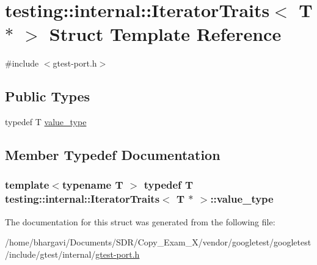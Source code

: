\hypertarget{structtesting_1_1internal_1_1_iterator_traits_3_01_t_01_5_01_4}{}\section{testing\+:\+:internal\+:\+:Iterator\+Traits$<$ T $\ast$ $>$ Struct Template Reference}
\label{structtesting_1_1internal_1_1_iterator_traits_3_01_t_01_5_01_4}


{\ttfamily \#include $<$gtest-\/port.\+h$>$}

\subsection*{Public Types}
\begin{DoxyCompactItemize}
\item 
typedef T \hyperlink{structtesting_1_1internal_1_1_iterator_traits_3_01_t_01_5_01_4_a7e46869ed36cc5aea898e243d270a8be}{value\+\_\+type}
\end{DoxyCompactItemize}


\subsection{Member Typedef Documentation}
\subsubsection[{\texorpdfstring{value\+\_\+type}{value_type}}]{\setlength{\rightskip}{0pt plus 5cm}template$<$typename T $>$ typedef T {\bf testing\+::internal\+::\+Iterator\+Traits}$<$ T $\ast$ $>$\+::{\bf value\+\_\+type}}\hypertarget{structtesting_1_1internal_1_1_iterator_traits_3_01_t_01_5_01_4_a7e46869ed36cc5aea898e243d270a8be}{}\label{structtesting_1_1internal_1_1_iterator_traits_3_01_t_01_5_01_4_a7e46869ed36cc5aea898e243d270a8be}


The documentation for this struct was generated from the following file\+:\begin{DoxyCompactItemize}
\item 
/home/bhargavi/\+Documents/\+S\+D\+R/\+Copy\+\_\+\+Exam\+\_\+X/vendor/googletest/googletest/include/gtest/internal/\hyperlink{gtest-port_8h}{gtest-\/port.\+h}\end{DoxyCompactItemize}
